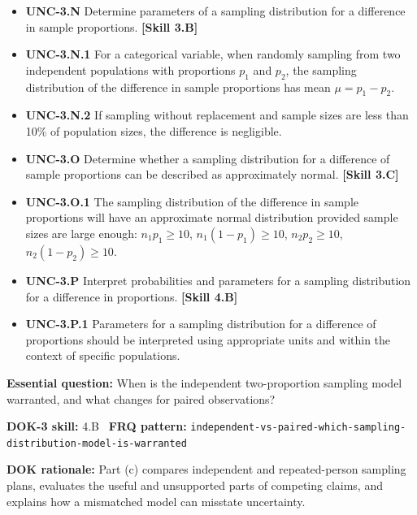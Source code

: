 \documentclass[11pt]{article}
\begin{document}


{\small
\begin{itemize}[leftmargin=1.5em,itemsep=2pt,topsep=2pt]
  \item \textbf{UNC-3.N} Determine parameters of a sampling distribution for a difference in sample proportions. \textbf{[Skill 3.B]}
  \item \textbf{UNC-3.N.1} For a categorical variable, when randomly sampling from two independent populations with proportions $p_1$ and $p_2$, the sampling distribution of the difference in sample proportions has mean $\mu=p_1-p_2$.
  \item \textbf{UNC-3.N.2} If sampling without replacement and sample sizes are less than 10\% of population sizes, the difference is negligible.
  \item \textbf{UNC-3.O} Determine whether a sampling distribution for a difference of sample proportions can be described as approximately normal. \textbf{[Skill 3.C]}
  \item \textbf{UNC-3.O.1} The sampling distribution of the difference in sample proportions will have an approximate normal distribution provided sample sizes are large enough: $n_1p_1\geq10$, $n_1(1-p_1)\geq10$, $n_2p_2\geq10$, $n_2(1-p_2)\geq10$.
  \item \textbf{UNC-3.P} Interpret probabilities and parameters for a sampling distribution for a difference in proportions. \textbf{[Skill 4.B]}
  \item \textbf{UNC-3.P.1} Parameters for a sampling distribution for a difference of proportions should be interpreted using appropriate units and within the context of specific populations.
\end{itemize}
}
\textbf{Essential question:} When is the independent two-proportion sampling model warranted, and what changes for paired observations?\par
\textbf{DOK-3 skill:} 4.B \textperiodcentered\ \textbf{FRQ pattern:} {\small\texttt{independent-\allowbreak{}vs-\allowbreak{}paired-\allowbreak{}which-\allowbreak{}sampling-\allowbreak{}distribution-\allowbreak{}model-\allowbreak{}is-\allowbreak{}warranted}}\par
\textbf{DOK rationale:} Part (c) compares independent and repeated-person sampling plans, evaluates the useful and unsupported parts of competing claims, and explains how a mismatched model can misstate uncertainty.\par
\end{document}
